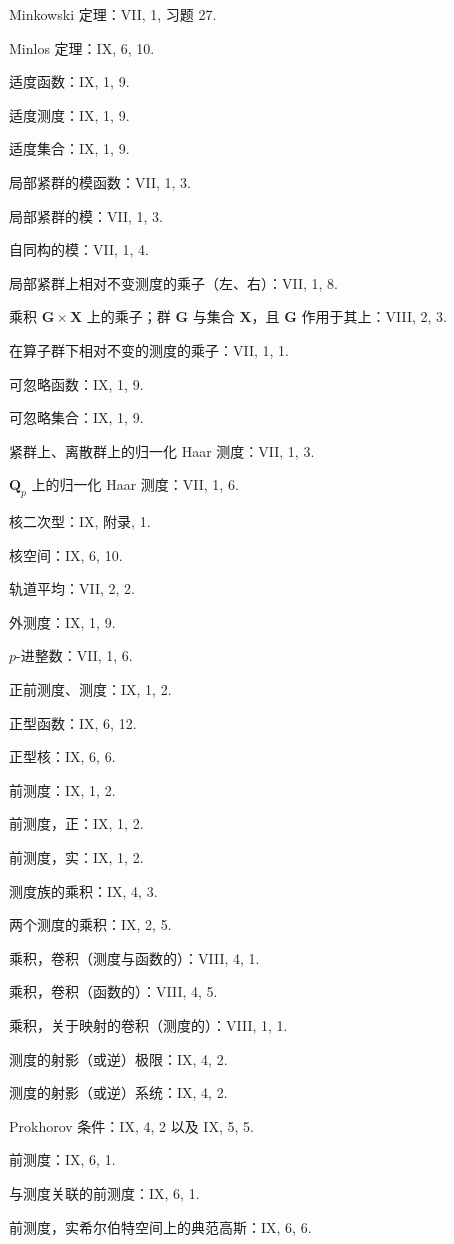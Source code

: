 Minkowski 定理：VII, 1, 习题 27.

Minlos 定理：IX, 6, 10.

适度函数：IX, 1, 9.

适度测度：IX, 1, 9.

适度集合：IX, 1, 9.

局部紧群的模函数：VII, 1, 3.

局部紧群的模：VII, 1, 3.

自同构的模：VII, 1, 4.

局部紧群上相对不变测度的乘子（左、右）：VII, 1, 8.

乘积 \(\mathbf{G} \times \mathbf{X}\) 上的乘子；群 \(\mathbf{G}\) 与集合 \(\mathbf{X}\)，且 \(\mathbf{G}\) 作用于其上：VIII, 2, 3.

在算子群下相对不变的测度的乘子：VII, 1, 1.

可忽略函数：IX, 1, 9.

可忽略集合：IX, 1, 9.

紧群上、离散群上的归一化 Haar 测度：VII, 1, 3.

\(\mathbf{Q}_p\) 上的归一化 Haar 测度：VII, 1, 6.

核二次型：IX, 附录, 1.

核空间：IX, 6, 10.

轨道平均：VII, 2, 2.

外测度：IX, 1, 9.

\(p\)-进整数：VII, 1, 6.

正前测度、测度：IX, 1, 2.

正型函数：IX, 6, 12.

正型核：IX, 6, 6.

前测度：IX, 1, 2.

前测度，正：IX, 1, 2.

前测度，实：IX, 1, 2.

测度族的乘积：IX, 4, 3.

两个测度的乘积：IX, 2, 5.

乘积，卷积（测度与函数的）：VIII, 4, 1.

乘积，卷积（函数的）：VIII, 4, 5.

乘积，关于映射的卷积（测度的）：VIII, 1, 1.

测度的射影（或逆）极限：IX, 4, 2.

测度的射影（或逆）系统：IX, 4, 2.

Prokhorov 条件：IX, 4, 2 以及 IX, 5, 5.

前测度：IX, 6, 1.

与测度关联的前测度：IX, 6, 1.

前测度，实希尔伯特空间上的典范高斯：IX, 6, 6.

